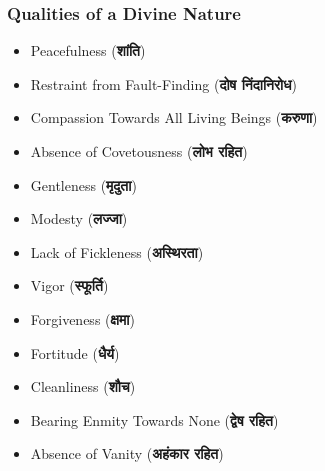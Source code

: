 \begin{frame}[fragile]\frametitle{Qualities of a Divine Nature}
    \begin{itemize}
        \item Peacefulness (\textbf{शांति})
        \item Restraint from Fault-Finding (\textbf{दोष निंदानिरोध})
        \item Compassion Towards All Living Beings (\textbf{करुणा})
        \item Absence of Covetousness (\textbf{लोभ रहित})
        \item Gentleness (\textbf{मृदुता})
        \item Modesty (\textbf{लज्जा})
        \item Lack of Fickleness (\textbf{अस्थिरता})
        \item Vigor (\textbf{स्फूर्ति})
        \item Forgiveness (\textbf{क्षमा})
        \item Fortitude (\textbf{धैर्य})
        \item Cleanliness (\textbf{शौच})
        \item Bearing Enmity Towards None (\textbf{द्वेष रहित})
        \item Absence of Vanity (\textbf{अहंकार रहित})
    \end{itemize}
\end{frame}






